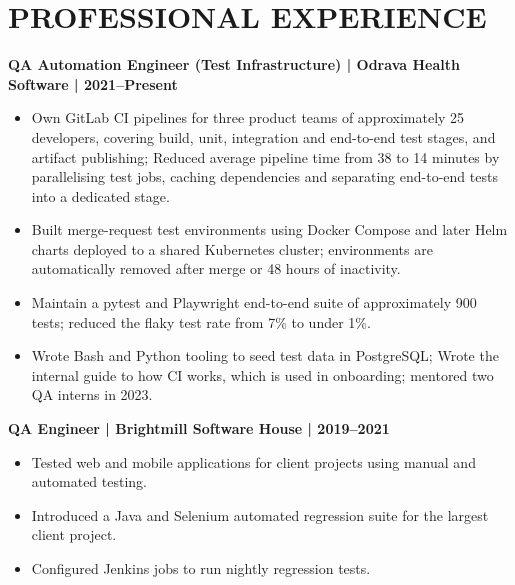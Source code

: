 \documentclass[11pt,a4paper]{article}
\begin{document}
\section*{PROFESSIONAL EXPERIENCE}
\textbf{QA Automation Engineer (Test Infrastructure) | Odrava Health Software | 2021--Present}
\begin{itemize}
\item Own GitLab CI pipelines for three product teams of approximately 25 developers, covering build, unit, integration and end-to-end test stages, and artifact publishing; Reduced average pipeline time from 38 to 14 minutes by parallelising test jobs, caching dependencies and separating end-to-end tests into a dedicated stage.
\item Built merge-request test environments using Docker Compose and later Helm charts deployed to a shared Kubernetes cluster; environments are automatically removed after merge or 48 hours of inactivity.
\item Maintain a pytest and Playwright end-to-end suite of approximately 900 tests; reduced the flaky test rate from 7\% to under 1\%.
\item Wrote Bash and Python tooling to seed test data in PostgreSQL; Wrote the internal guide to how CI works, which is used in onboarding; mentored two QA interns in 2023.
\end{itemize}
\textbf{QA Engineer | Brightmill Software House | 2019--2021}
\begin{itemize}
\item Tested web and mobile applications for client projects using manual and automated testing.
\item Introduced a Java and Selenium automated regression suite for the largest client project.
\item Configured Jenkins jobs to run nightly regression tests.
\end{itemize}
\end{document}

